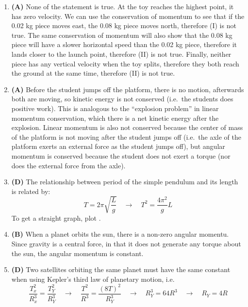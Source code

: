 \documentclass{../../oss-handout}
\begin{document}
\begin{enumerate}[leftmargin=17pt]
\item\textbf{(A)} None of the statement is true. At the toy reaches the highest
  point, it has zero velocity. We can use the conservation of momentum to
  see that if the 0.02 kg piece moves east, the 0.08 kg piece moves north,
  therefore (I) is not true. The same conservation of momentum will also show
  that the 0.08 kg piece will have a slower horizontal speed than the 0.02 kg
  piece, therefore it lands closer to the launch point, therefore (II) is not
  true. Finally, neither piece has any vertical velocity when the toy splits,
  therefore they both reach the ground at the same time, therefore (II) is not
  true.

\item\textbf{(A)} Before the student jumps off the platform, there is no
  motion, afterwards both are moving, so kinetic energy is not conserved (i.e.\
  the students does positive work). This is analogous to the ``explosion
  problem'' in linear momentum conservation, which there is a net kinetic
  energy after the explosion. Linear momentum is also not conserved
  because the center of mass of the platform is not moving after the student
  jumps off (i.e.\ the axle of the platform exerts an external force as the
  student jumps off), but angular momentum is conserved because the student
  does not exert a torque (nor does the external force from the axle).
  
\item\textbf{(D)} The relationship between period of the simple pendulum and its
  length is related by:
  \begin{displaymath}
    T=2\pi\sqrt{\frac Lg}\quad\longrightarrow\quad
    T^2=\frac{4\pi^2}gL
  \end{displaymath}
  To get a straight graph, plot .

\item\textbf{(B)} When a planet orbits the sun, there is a non-zero angular
  momentu. Since gravity is a central force, in that it does not generate any
  torque about the sun, the angular momentum is constant.

\item\textbf{(D)} Two satellites orbiting the same planet must have the same
  constant when using Kepler's third law of planetary motion, i.e.
  \begin{displaymath}
    \frac{T_x^2}{R_x^3}=\frac{T_Y^2}{R_Y^3}\quad\longrightarrow\quad
    \frac{T^2}{R^3}=\frac{(8T)^2}{R_Y^3}\quad\longrightarrow\quad
    R_Y^3=64R^3\quad\longrightarrow\quad R_Y=\boxed{4R}
  \end{displaymath}


\end{enumerate}
\end{document}

